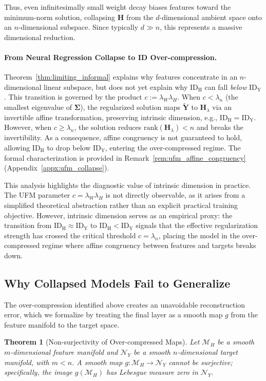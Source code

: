 \documentclass{article}
\newcommand{\bY}{{\mathbf Y}}
\newcommand{\bH}{{\mathbf H}}
\newcommand{\bSigma}{{\mathbf \Sigma}}
\newcommand{\idh}{\ensuremath{\mathrm{ID}_{\mathrm{H}}}}
\newcommand{\idy}{\ensuremath{\mathrm{ID}_{\mathrm{Y}}}}
\theoremstyle{plain}
\newtheorem{theorem}{Theorem}[section]
\theoremstyle{definition}
\theoremstyle{remark}
\begin{document}
Thus, even infinitesimally small weight decay biases features toward the minimum-norm solution, collapsing $\bH$ from the $d$-dimensional ambient space onto an $n$-dimensional subspace. Since typically $d \gg n$, this represents a massive dimensional reduction.

\paragraph{From Neural Regression Collapse to ID Over-compression.}
Theorem~\ref{thm:limiting_informal} explains why features concentrate in an $n$-dimensional linear subspace, but does not yet explain why $\idh$ can fall \emph{below} $\idy$. This transition is governed by the product $c := \lambda_W \lambda_H$. When $c < \lambda_n$ (the smallest eigenvalue of $\bSigma$), the regularized solution maps $\tilde{\bY}$ to $\bH_\lambda$ via an invertible affine transformation, preserving intrinsic dimension, e.g., $\idh = \idy$. However, when $c \geq \lambda_n$, the solution reduces $\text{rank}(\bH_\lambda) < n$ and breaks the invertibility. As a consequence, affine congruency is not guaranteed to hold, allowing $\idh$ to drop below $\idy$, entering the over-compressed regime. The formal characterization is provided in Remark~\ref{rem:ufm_affine_congruency} (Appendix~\ref{appx:ufm_collapse}).

This analysis highlights the diagnostic value of intrinsic dimension in practice. The UFM parameter $c = \lambda_W \lambda_H$ is not directly observable, as it arises from a simplified theoretical abstraction rather than an explicit practical training objective. However, intrinsic dimension serves as an empirical proxy: the transition from $\idh \approx \idy$ to $\idh < \idy$ signals that the effective regularization strength has crossed the critical threshold $c = \lambda_n$, placing the model in the over-compressed regime where affine congruency between features and targets breaks down.

\subsection{Why Collapsed Models Fail to Generalize}
\label{sec:why_fail}

The over-compression identified above creates an unavoidable reconstruction error, which we formalize by treating the final layer as a smooth map $g$ from the feature manifold to the target space.

\begin{theorem}[Non-surjectivity of Over-compressed Maps]
\label{thm:non_surjectivity}
Let $\mathcal{M}_H$ be a smooth $m$-dimensional feature manifold and $\mathcal{N}_Y$ be a smooth $n$-dimensional target manifold, with $m < n$. A smooth map $g: \mathcal{M}_H \to \mathcal{N}_Y$ cannot be surjective; specifically, the image $g(\mathcal{M}_H)$ has Lebesgue measure zero in $\mathcal{N}_Y$.
\end{theorem}
\end{document}
